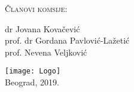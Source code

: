 \documentclass[
11pt, %
serbian,
singlespacing, %
headsepline, %
]{MastersDoctoralThesis} %
\begin{document}
\begin{titlepage}
\begin{center}
{\scshape\LARGE Članovi komsije:\par}\vspace{0.2cm} %
dr Jovana Kovačević \\
prof. dr Gordana Pavlović-Lažetić  \\
prof. Nevena Veljković\\

 
\vfill

\vspace{1cm}
\texttt{[image: Logo]}\\ %
\vspace{0.5cm}
{\large Beograd, 2019.}\\ %
 
\vfill
\end{center}
\end{titlepage}



%
%  
%  
%
\end{document}
